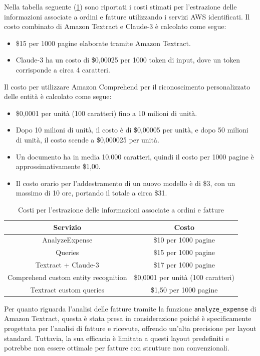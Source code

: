 Nella tabella seguente (\ref{tab:costi-estrazione}) sono riportati i costi stimati per l'estrazione delle informazioni associate a ordini e fatture utilizzando i servizi AWS identificati. 
Il costo combinato di Amazon Textract e Claude-3 è calcolato come segue:
\begin{itemize}
  \item \$15 per 1000 pagine elaborate tramite Amazon Textract.
  \item Claude-3 ha un costo di \$0,00025 per 1000 token di input, dove un token corrisponde a circa 4 caratteri.
\end{itemize}
Il costo per utilizzare Amazon Comprehend per il riconoscimento personalizzato delle entità è calcolato come segue:
\begin{itemize}
  \item \$0,0001 per unità (100 caratteri) fino a 10 milioni di unità.
  \item Dopo 10 milioni di unità, il costo è di \$0,00005 per unità, e dopo 50 milioni di unità, il costo scende a \$0,000025 per unità.
  \item Un documento ha in media 10.000 caratteri, quindi il costo per 1000 pagine è approssimativamente \$1,00.
  \item Il costo orario per l'addestramento di un nuovo modello è di \$3, con un massimo di 10 ore, portando il totale a circa \$31.
\end{itemize}

\begin{table}[h]
  \centering
  \begin{tabular}{|c|c|}
    \hline
    \textbf{Servizio} & \textbf{Costo} \\
    \hline
    AnalyzeExpense & \$10 per 1000 pagine \\
    \hline
    Queries & \$15 per 1000 pagine \\
    \hline
    Textract + Claude-3 & \$17 per 1000 pagine \\
    \hline
    Comprehend custom entity recognition & \$0,0001 per unità (100 caratteri) \\
    \hline
    Textract custom queries & \$1,50 per 1000 pagine \\
    \hline
  \end{tabular}
  \caption{Costi per l'estrazione delle informazioni associate a ordini e fatture}
    \label{tab:costi-estrazione}
\end{table}

Per quanto riguarda l'analisi delle fatture tramite la funzione \texttt{analyze\_expense} di Amazon Textract, questa è stata presa in considerazione poiché è specificamente progettata per l'analisi di fatture e ricevute, offrendo un'alta precisione per layout standard. Tuttavia, la sua efficacia è limitata a questi layout predefiniti e potrebbe non essere ottimale per fatture con strutture non convenzionali.

